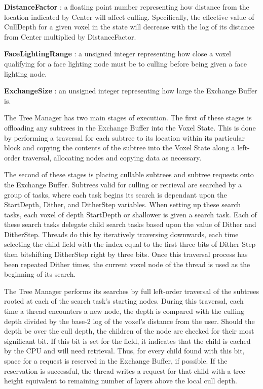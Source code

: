 \documentclass[onecolumn, draftclsnofoot,10pt, compsoc]{IEEEtran}
\newcounter{threesection}[subsubsection]
\begin{document}
\noindent \textbf{DistanceFactor} : a floating point number representing how distance from the location indicated by Center will affect culling. Specifically, the effective value of CullDepth for a given voxel in the state will decrease with the log of its distance from Center multiplied by DistanceFactor.

\noindent \textbf{FaceLightingRange} : a unsigned integer representing how close a voxel qualifying for a face lighting node must be to culling before being given a face lighting node.

\noindent \textbf{ExchangeSize} : an unsigned integer representing how large the Exchange Buffer is.


The Tree Manager has two main stages of execution. The first of these stages is offloading any subtrees in the Exchange Buffer into the Voxel State. This is done by performing a traversal for each subtree to its location within its particular block and copying the contents of the subtree into the Voxel State along a left-order traversal, allocating nodes and copying data as necessary.

The second of these stages is placing cullable subtrees and subtree requests onto the Exchange Buffer. Subtrees valid for culling or retrieval are searched by a group of tasks, where each task begins its search is dependant upon the StartDepth, Dither, and DitherStep variables. When setting up these search tasks, each voxel of depth StartDepth or shallower is given a search task. Each of these search tasks delegate child search tasks based upon the value of Dither and DitherStep. Threads do this by iteratively traversing downwards, each time selecting the child field with the index equal to the first three bits of Dither Step then bitshifting DitherStep right by three bits. Once this traversal process has been repeated Dither times, the current voxel node of the thread is used as the beginning of its search.

The Tree Manager performs its searches by full left-order traversal of the subtrees rooted at each of the search task’s starting nodes. During this traversal, each time a thread encounters a new node, the depth is compared with the culling depth divided by the base-2 log of the voxel’s distance from the user. Should the depth be over the cull depth, the children of the node are checked for their most significant bit. If this bit is set for the field, it indicates that the child is cached by the CPU and will need retrieval. Thus, for every child found with this bit, space for a request is reserved in the Exchange Buffer, if possible. If the reservation is successful, the thread writes a request for that child with a tree height equivalent to remaining number of layers above the local cull depth.
\end{document}
